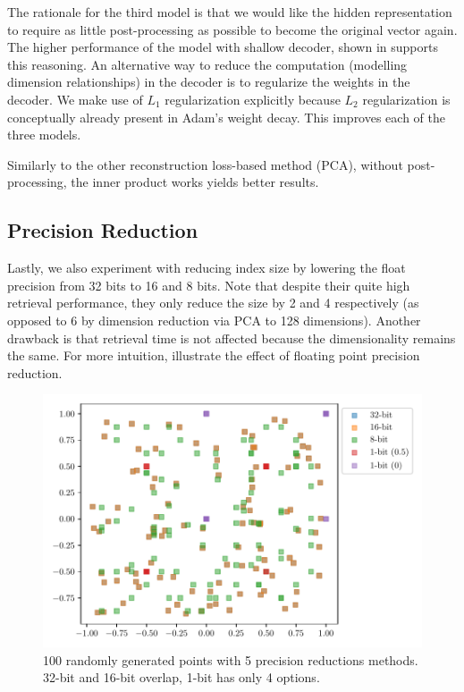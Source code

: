 The rationale for the third model is that we would like the hidden representation to require as little post-processing as possible to become the original vector again.
The higher performance of the model with shallow decoder, shown in  supports this reasoning.
An alternative way to reduce the computation (modelling dimension relationships) in the decoder is to regularize the weights in the decoder.
We make use of $L_1$ regularization explicitly because $L_2$ regularization is conceptually already present in Adam's weight decay.
This improves each of the three models.

Similarly to the other reconstruction loss-based method (PCA), without post-processing, the inner product works yields better results.






\subsection{Precision Reduction} \label{subsec:prec_reduction}

Lastly, we also experiment with reducing index size by lowering the float precision from 32 bits to 16 and 8 bits.
Note that despite their quite high retrieval performance, they only reduce the size by 2 and 4 respectively (as opposed to 6 by dimension reduction via PCA to 128 dimensions).
Another drawback is that retrieval time is not affected because the dimensionality remains the same.
For more intuition,  illustrate the effect of floating point precision reduction.

\begin{figure}[ht]
    \center
    \includegraphics[width=0.85\linewidth]{img/prec_examples.pdf}
    \caption{100 randomly generated points with 5 precision reductions methods. 32-bit and 16-bit overlap, 1-bit has only 4 options.}
    \label{fig:prec_examples}
\end{figure}

